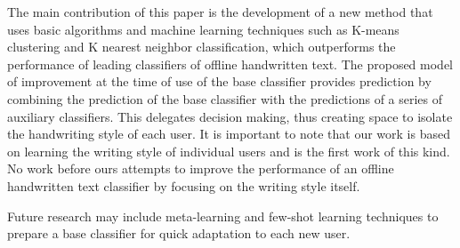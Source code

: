 \documentclass{article}
\begin{document}
The main contribution of this paper is the development of a new method that uses basic algorithms and machine learning techniques such as K-means clustering 
and K nearest neighbor classification, which outperforms the performance of leading classifiers of offline handwritten text. 
The proposed model of improvement at the time of use of the base classifier provides prediction by combining the prediction of the base classifier 
with the predictions of a series of auxiliary classifiers. 
This delegates decision making, thus creating space to isolate the handwriting style of each user. 
It is important to note that our work is based on learning the writing style of individual users and is the first work of this kind. 
No work before ours attempts to improve the performance of an offline handwritten text classifier by focusing on the writing style itself. 

Future research may include meta-learning and few-shot learning techniques to prepare a base classifier for quick adaptation to each new user. 

\small
\end{document}
